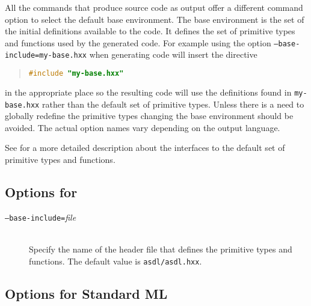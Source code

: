 All the commands that produce source code as output offer a different
command option to select the default base environment.
The base environment is the set of the initial definitions available to the code.
It defines the set of primitive types and functions used by the generated code.
For example using the option \texttt{--base-include=my-base.hxx}
when generating \Cplusplus{} code will insert the directive
\begin{quote}\begin{lstlisting}[language=c++]
#include "my-base.hxx"
\end{lstlisting}\end{quote}%
in the appropriate place so the resulting code will use the definitions found in
\texttt{my-base.hxx} rather than the default set of primitive types.
Unless there is a need to globally redefine
the primitive types changing the base environment should be avoided.
The actual option names vary depending on the output language.

See  for a more detailed description about the interfaces
to the default set of primitive types and functions.

\subsection*{Options for \Cplusplus}

\begin{description}
  \item[\normalfont\texttt{--base-include=}\textit{file}] \mbox{}\\
    Specify the name of the \Cplusplus{}header file that defines the primitive \asdl{} types
    and functions.
    The default value is \texttt{asdl/asdl.hxx}.
\end{description}%

\subsection*{Options for Standard ML}


